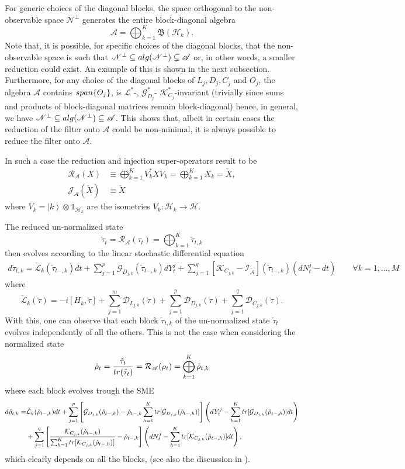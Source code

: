 \documentclass[aihp,12pt]{imsart}
\newcommand{\Dc}{\mathcal{D}}
\newcommand{\Gc}{\mathcal{G}}
\newcommand{\Hc}{\mathcal{H}}
\newcommand{\Jc}{\mathcal{J}}
\newcommand{\Rc}{\mathcal{R}}
\newcommand{\Ic}{\mathcal{I}}
\newcommand{\Kc}{\mathcal{K}}
\newcommand{\Lc}{\mathcal{L}}
\newcommand{\As}{\mathscr{A}}
\newcommand{\Ns}{\mathscr{N}}
\newcommand{\Bf}{\mathfrak{B}}
\newcommand{\one}{\mathbb{1}}
\newcommand{\tr}{{\rm tr}}
\newcommand{\Span}{{\rm span}}
\newcommand{\alg}{{\rm alg}}
\newcommand{\ket}[1]{\left| #1 \right>}
\theoremstyle{theorem}
\theoremstyle{definition}
\theoremstyle{remark}
\begin{document}
For generic choices of the diagonal blocks, the space orthogonal to the non-observable space $\Ns^\perp$ generates the entire block-diagonal algebra
\[\As = \bigoplus_{k=1}^K \Bf(\Hc_k).\]
Note that, it is possible, for specific choices of the diagonal blocks, that the non-observable space is such that $\Ns^\perp\subseteq\alg(\Ns^\perp)\subsetneq\As$ or, in other words, a smaller reduction could exist. An example of this is shown in the next subsection.
Furthermore, for any choice of the diagonal blocks of $L_j,D_j,C_j$ and $O_j$, the algebra $\As$ contains $\Span\{O_j\}$, is $\Lc^*$-, $\Gc_{D_j}^*$- $\Kc^*_{C_j}$-invariant (trivially since sums and products of block-diagonal matrices remain block-diagonal) hence, in general, we have $\Ns^\perp \subseteq \alg(\Ns^\perp) \subseteq \As$. This shows that, albeit in certain cases the reduction of the filter onto $\As$ could be non-minimal, it is always possible to reduce the filter onto $\As$. 

In such a case the reduction and injection super-operators result to be 
\begin{align*}
    \Rc_\As(X) &\equiv \bigoplus_{k=1}^K V_k^* X V_k = \bigoplus_{k=1}^K X_k = \check{X},\\
    \Jc_\As(\check{X}) &\equiv \check{X}
\end{align*}
where $V_k = \ket{k} \otimes \one_{\Hc_k}$ are the isometries $V_k:\Hc_k\to\Hc$. 

The reduced un-normalized state $$\check{\tau}_t = \Rc_\As(\tau_t) = \bigoplus_{k=1}^K \check{\tau}_{t,k}$$ then evolves according to the linear stochastic differential equation 
\begin{align*}
    d\check{\tau}_{t,k} = \check{\Lc}_{k}(\check{\tau}_{t-,k})dt + \sum_{j=1}^{p}\Gc_{{D}_{j,k}}(\check{\tau}_{t-,k}) dY_t^j +\sum_{j=1}^q \left[\Kc_{{C}_{j,k}}-\Ic_{\check{\As}}\right](\check{\tau}_{t-,k}) (dN_t^j-dt)  \qquad \forall k=1,\dots,M
\end{align*}
where 
\[\check{\Lc}_{k}(\check{\tau}) = -i[H_k,\check{\tau}] + \sum_{j=1}^{m}\Dc_{L_{j,k}}(\check{\tau}) + \sum_{j=1}^{p}\Dc_{D_{j,k}}(\check{\tau}) + \sum_{j=1}^{q}\Dc_{C_{j,k}}(\check{\tau}).\]
With this, one can observe that each block $\check{\tau}_{t,k}$ of the un-normalized state $\check{\tau}_{t}$ evolves independently of all the others. This is not the case when considering the normalized state $$\check{\rho}_t = \frac{\check{\tau}_t}{\tr(\check{\tau}_t)}= \Rc_\As(\rho_t) = \bigoplus_{k=1}^K \check{\rho}_{t,k}$$ where each block evolves trough the SME 
\begin{align*}
        d\check{\rho}_{t,k} = & \check{\Lc}_k(\check{\rho}_{t-,k}) dt + \sum_{j=1}^{p} \left[ \Gc_{D_{j,k}}(\check{\rho}_{t-,k}) - \check{\rho}_{t-,k}\sum_{h=1}^K\tr[\Gc_{D_{j,h}}(\check{\rho}_{t-,h})] \right] \left(dY_t^j - \sum_{h=1}^K\tr[\Gc_{D_{j,h}}(\check{\rho}_{t-,h})] dt\right)\\ & +  \sum_{j=1}^{q}\left[\frac{\Kc_{C_{j,k}}(\check{\rho}_{t-,k})}{\sum_{h=1}^K\tr[\Kc_{C_{j,h}}(\check{\rho}_{t-,h})]}-\check{\rho}_{t-,k}\right]\left(dN_t^j-\sum_{h=1}^K\tr[\Kc_{C_{j,h}}(\check{\rho}_{t-,h})]dt\right),
\end{align*}
which clearly depends on all the blocks, (see also the discussion in \cite{amini2021asymptotic}).
\end{document}
